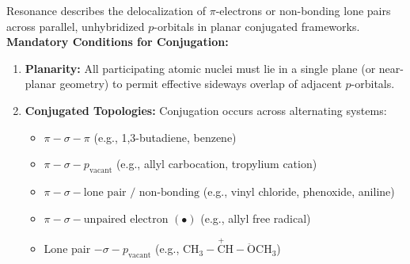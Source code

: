 \documentclass[10pt,a4paper]{article}
\begin{document}
\begin{conceptbox}
Resonance describes the delocalization of $\pi$-electrons or non-bonding lone pairs across parallel, unhybridized $p$-orbitals in planar conjugated frameworks.
\textbf{Mandatory Conditions for Conjugation:}
\begin{enumerate}[leftmargin=*]
  \item \textbf{Planarity:} All participating atomic nuclei must lie in a single plane (or near-planar geometry) to permit effective sideways overlap of adjacent $p$-orbitals.
  \item \textbf{Conjugated Topologies:} Conjugation occurs across alternating systems:
  \begin{itemize}
    \item $\pi - \sigma - \pi$ (e.g., 1,3-butadiene, benzene)
    \item $\pi - \sigma - p_{\text{vacant}}$ (e.g., allyl carbocation, tropylium cation)
    \item $\pi - \sigma - \text{lone pair / non-bonding}$ (e.g., vinyl chloride, phenoxide, aniline)
    \item $\pi - \sigma - \text{unpaired electron } (\bullet)$ (e.g., allyl free radical)
    \item Lone pair $- \sigma - p_{\text{vacant}}$ (e.g., $\mathrm{CH_3-\overset{+}{C}H-\ddot{O}CH_3}$)
  \end{itemize}
\end{enumerate}
\end{conceptbox}
\end{document}
